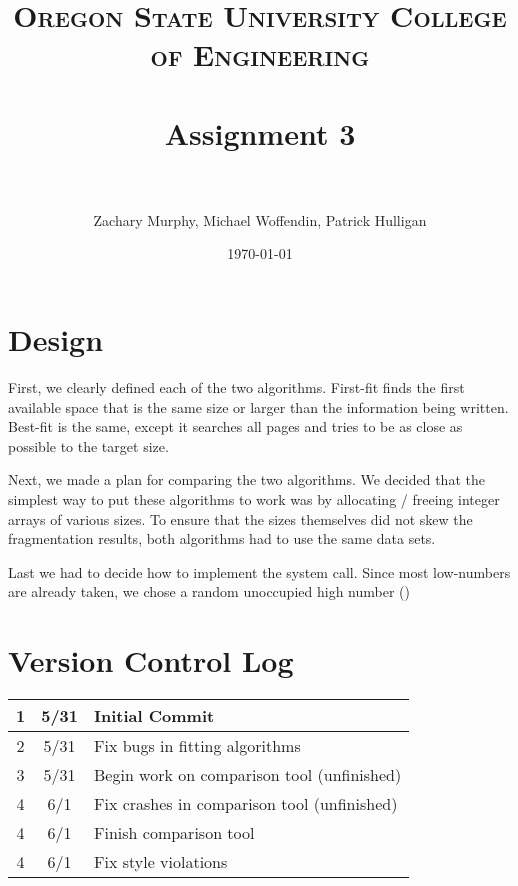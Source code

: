 \documentclass[paper=a4, fontsize=11pt]{scrartcl} %
\title{	
\normalfont \normalsize 
\textsc{Oregon State University College of Engineering} \\ [25pt] %
\horrule{0.5pt} \\[0.4cm] %
\huge Assignment 3 \\ %
\horrule{2pt} \\[0.5cm] %
}
\author{Zachary Murphy, Michael Woffendin, Patrick Hulligan} %
\date{\normalsize\today} %
\numberwithin{equation}{section} %
\numberwithin{figure}{section} %
\numberwithin{table}{section} %
\begin{document}
\maketitle %


\section*{Design}

First, we clearly defined each of the two algorithms. First-fit finds the first available space that
 is the same size or larger than the information being written. Best-fit is the same, except it 
searches all pages and tries to be as close as possible to the target size. 

Next, we made a plan for comparing the two algorithms. We decided that the simplest way to put 
these algorithms to work was by allocating / freeing integer arrays of various sizes. To ensure 
that the sizes themselves did not skew the fragmentation results, both algorithms had to use the 
same data sets. 

Last we had to decide how to implement the system call. Since most low-numbers are already taken, 
we chose a random unoccupied high number ()

\section* {Version Control Log}
\begin{tabular}{ c | c | l }

\hline
1 & 5/31 & Initial Commit \\ \hline 

2 & 5/31 & Fix bugs in fitting algorithms \\  \hline
 
3 & 5/31 & Begin work on comparison tool (unfinished) \\ \hline

4 & 6/1 & Fix crashes in comparison tool (unfinished) \\ \hline

4 & 6/1 & Finish comparison tool \\ \hline

4 & 6/1 & Fix style violations \\ \hline


\end{tabular}
\end{document}
